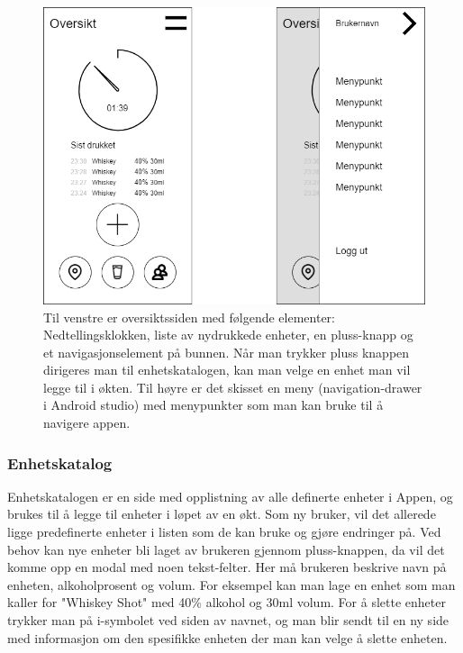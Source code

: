 \begin{figure}[H]
    \centering
    \includegraphics[scale=0.4]{images/lille_promille_frontpage.drawio.png}
    \caption{Til venstre er oversiktssiden med følgende elementer: Nedtellingsklokken, liste av nydrukkede enheter, en pluss-knapp og et navigasjonselement på bunnen. Når man trykker pluss knappen dirigeres man til enhetskatalogen, kan man velge en enhet man vil legge til i økten. Til høyre er det skisset en meny (navigation-drawer i Android studio) med menypunkter som man kan bruke til å navigere appen.}
\end{figure}

\subsubsection{Enhetskatalog}
Enhetskatalogen er en side med opplistning av alle definerte enheter i Appen, og brukes til å legge til enheter i løpet av en økt. Som ny bruker, vil det allerede ligge predefinerte enheter i listen som de kan bruke og gjøre endringer på. Ved behov kan nye enheter bli laget av brukeren gjennom pluss-knappen, da vil det komme opp en modal med noen tekst-felter. Her må brukeren beskrive navn på enheten, alkoholprosent og volum. For eksempel kan man lage en enhet som man kaller for "Whiskey Shot" med 40\% alkohol og 30ml volum. For å slette enheter trykker man på i-symbolet ved siden av navnet, og man blir sendt til en ny side med informasjon om den spesifikke enheten der man kan velge å slette enheten.

